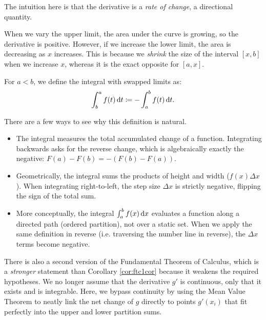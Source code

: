\documentclass[../analysis1.tex]{subfiles}
\begin{document}
\begin{remark}
    The intuition here is that the derivative is a \textit{rate of change}, a directional quantity. 
    
    When we vary the upper limit, the area under the curve is growing, so the derivative is positive. However, if we increase the lower limit, the area is decreasing as $x$ increases. This is because we \textit{shrink} the size of the interval $[x,b]$ when we increase $x$, whereas it is the exact opposite for $[a,x]$.
\end{remark}

\begin{definition}
    \begin{shaded*}
        For $a< b$, we define the integral with swapped limits as:
        \[
            \int_b^a f(t) \d{t} \coloneqq -\int_a^b f(t) \d{t}.
        \]
    \end{shaded*}
\end{definition}

\begin{remark}
    There are a few ways to see why this definition is natural.
    \begin{itemize}
        \item The integral measures the total accumulated change of a function. Integrating backwards asks for the reverse change, which is algebraically exactly the negative: $F(a) - F(b) = -(F(b) - F(a))$.
        \item Geometrically, the integral sums the products of height and width ($f(x) \Delta x$). When integrating right-to-left, the step size $\Delta x$ is strictly negative, flipping the sign of the total sum.
        \item More conceptually, the integral $\int_a^b f(x) \d{x}$ evaluates a function along a directed path (ordered partition), not over a static set. When we apply the same definition in reverse (i.e. traversing the number line in reverse), the $\Delta x$ terms become negative.
    \end{itemize}
\end{remark}

There is also a second version of the Fundamental Theorem of Calculus, which is a \textit{stronger} statement than Corollary \ref{cor:ftc1cor} because it weakens the required hypotheses. We no longer assume that the derivative $g'$ is continuous, only that it exists and is integrable. Here, we bypass continuity by using the Mean Value Theorem to neatly link the net change of $g$ directly to points $g'(x_i)$ that fit perfectly into the upper and lower partition sums.
\end{document}
